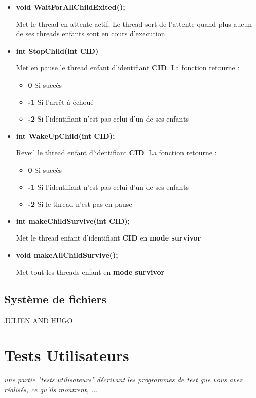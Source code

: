 \documentclass{article}
\begin{document}
\begin{itemize}
  \item 
  \textbf{void WaitForAllChildExited();}
  
  Met le thread en attente actif. Le thread sort de l'attente quand plus aucun de ses threads enfants sont en cours d'execution
  
  \item 
  \textbf{int StopChild(int CID)}
  
  Met en pause le thread enfant d'identifiant \textbf{CID}. 
  La fonction retourne :    
    \begin{itemize}
      \item \textbf{0} Si succès
      \item \textbf{-1} Si l'arrêt à échoué
      \item \textbf{-2} Si l'identifiant n'est pas celui d'un de ses enfants
    \end{itemize}       
    
  
  \item 
  \textbf{int WakeUpChild(int CID);}
  
    
  Reveil le thread enfant d'identifiant \textbf{CID}. 
  La fonction retourne :    
    \begin{itemize}
      \item \textbf{0} Si succès
      \item \textbf{-1} Si l'identifiant n'est pas celui d'un de ses enfants
      \item \textbf{-2} Si le thread n'est pas en pause
    \end{itemize} 
  
  \item 
  \textbf{int makeChildSurvive(int CID);}
  
  Met le thread enfant d'identifiant \textbf{CID} en \textbf{mode survivor}
  
  \item 
  \textbf{void makeAllChildSurvive();}
  
  Met tout les threads enfant en \textbf{mode survivor}
\end{itemize}

\subsection{Système de fichiers}
JULIEN AND HUGO

\section{Tests Utilisateurs}
\textit{une partie "tests utilisateurs" décrivant les programmes de test que vous avez réalisés, ce qu'ils montrent, ...}
\vspace{5mm}
\end{document}
